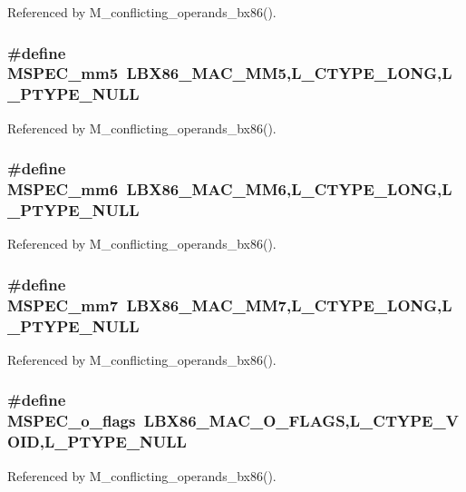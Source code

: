 Referenced by M\_\-conflicting\_\-operands\_\-bx86().
\subsubsection{\setlength{\rightskip}{0pt plus 5cm}\#define MSPEC\_\-mm5~LBX86\_\-MAC\_\-MM5,L\_\-CTYPE\_\-LONG,L\_\-PTYPE\_\-NULL}\label{ml__bx86_8c_dec4ce6f5cb425f874ac954b050d474a}




Referenced by M\_\-conflicting\_\-operands\_\-bx86().
\subsubsection{\setlength{\rightskip}{0pt plus 5cm}\#define MSPEC\_\-mm6~LBX86\_\-MAC\_\-MM6,L\_\-CTYPE\_\-LONG,L\_\-PTYPE\_\-NULL}\label{ml__bx86_8c_a6c0f9cd43b7eb6e322160547f82fab6}




Referenced by M\_\-conflicting\_\-operands\_\-bx86().
\subsubsection{\setlength{\rightskip}{0pt plus 5cm}\#define MSPEC\_\-mm7~LBX86\_\-MAC\_\-MM7,L\_\-CTYPE\_\-LONG,L\_\-PTYPE\_\-NULL}\label{ml__bx86_8c_8fb0a4cfc33bb6513bd4c84ef65d74db}




Referenced by M\_\-conflicting\_\-operands\_\-bx86().
\subsubsection{\setlength{\rightskip}{0pt plus 5cm}\#define MSPEC\_\-o\_\-flags~LBX86\_\-MAC\_\-O\_\-FLAGS,L\_\-CTYPE\_\-VOID,L\_\-PTYPE\_\-NULL}\label{ml__bx86_8c_960b20637a18489257e191bdb24a5978}




Referenced by M\_\-conflicting\_\-operands\_\-bx86().

